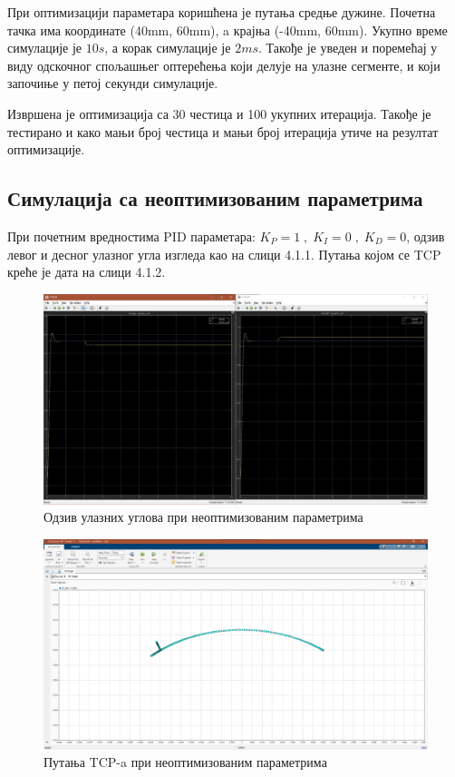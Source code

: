 \documentclass[12pt]{article}
\begin{document}
При оптимизацији параметара коришћена је путања средње дужине. Почетна тачка има координате (40mm, 60mm), a крајња (-40mm, 60mm).
Укупно време симулације је $10 s$, а корак симулације је $2 ms$. Такође је уведен и поремећај у виду одскочног спољашњег оптерећења који делује на улазне сегменте, и који започиње у петој секунди симулације.

Извршена је оптимизација са 30 честица и 100 укупних итерација. Такође је тестирано и како мањи број честица и мањи број итерација утиче на резултат оптимизације.
\subsection{Симулација са неоптимизованим параметрима}
При почетним вредностима PID параметара: $K_P=1\;,\;K_I=0\;,\;K_D=0$, одзив левог и десног улазног угла изгледа као на слици 4.1.1. Путања којом се TCP креће је дата на слици 4.1.2.
\begin{figure}[H]
    \centering
    \includegraphics[width=17.5cm]{figures/theta_neopti.jpg}
    \caption{Одзив улазних углова при неоптимизованим параметрима}
    \label{fig:theta_neopti}
\end{figure}
\begin{figure}[H]
    \centering
    \includegraphics[width=17.5cm]{figures/xy_neopti.jpg}
    \caption{Путања TCP-a при неоптимизованим параметрима}
    \label{fig:xy_neopti}
\end{figure}
\end{document}
